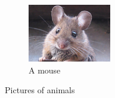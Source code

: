 \documentclass{article}
\begin{document}
\begin{figure}
        \begin{subfigure}[b]{0.3\textwidth}
                \centering
                \includegraphics[width=\textwidth]{Figs/subfig3}
                \caption{A mouse}
                \label{fig:mouse}
        \end{subfigure}
        
        \caption{Pictures of animals}
        \label{fig:animals}
        
\end{figure}
\end{document}
